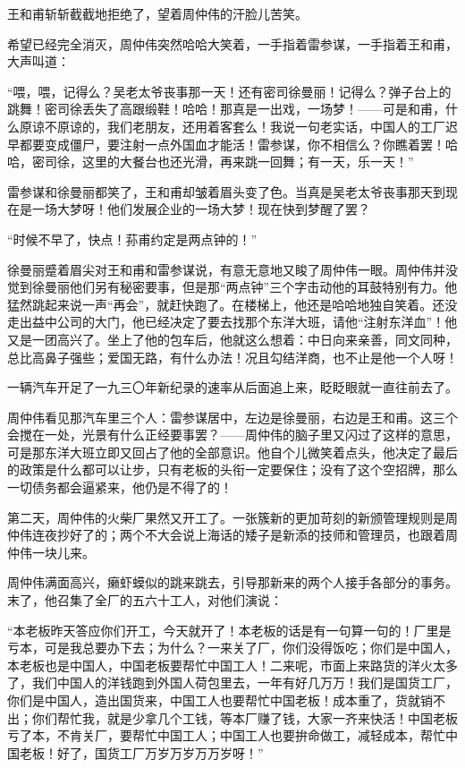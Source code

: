 \par 王和甫斩斩截截地拒绝了，望着周仲伟的汗脸儿苦笑。
\par 希望已经完全消灭，周仲伟突然哈哈大笑着，一手指着雷参谋，一手指着王和甫，大声叫道：
\par “喂，喂，记得么？吴老太爷丧事那一天！还有密司徐曼丽！记得么？弹子台上的跳舞！密司徐丢失了高跟缎鞋！哈哈！那真是一出戏，一场梦！——可是和甫，什么原谅不原谅的，我们老朋友，还用着客套么！我说一句老实话，中国人的工厂迟早都要变成僵尸，要注射一点外国血才能活！雷参谋，你不相信么？你瞧着罢！哈哈，密司徐，这里的大餐台也还光滑，再来跳一回舞；有一天，乐一天！”
\par 雷参谋和徐曼丽都笑了，王和甫却皱着眉头变了色。当真是吴老太爷丧事那天到现在是一场大梦呀！他们发展企业的一场大梦！现在快到梦醒了罢？
\par “时候不早了，快点！荪甫约定是两点钟的！”
\par 徐曼丽蹙着眉尖对王和甫和雷参谋说，有意无意地又睃了周仲伟一眼。周仲伟并没觉到徐曼丽他们另有秘密要事，但是那“两点钟”三个字击动他的耳鼓特别有力。他猛然跳起来说一声“再会”，就赶快跑了。在楼梯上，他还是哈哈地独自笑着。还没走出益中公司的大门，他已经决定了要去找那个东洋大班，请他“注射东洋血”！他又是一团高兴了。坐上了他的包车后，他就这么想着：中日向来亲善，同文同种，总比高鼻子强些；爱国无路，有什么办法！况且勾结洋商，也不止是他一个人呀！
\par 一辆汽车开足了一九三〇年新纪录的速率从后面追上来，眨眨眼就一直往前去了。
\par 周仲伟看见那汽车里三个人：雷参谋居中，左边是徐曼丽，右边是王和甫。这三个会搅在一处，光景有什么正经要事罢？——周仲伟的脑子里又闪过了这样的意思，可是那东洋大班立即又回占了他的全部意识。他自个儿微笑着点头，他决定了最后的政策是什么都可以让步，只有老板的头衔一定要保住；没有了这个空招牌，那么一切债务都会逼紧来，他仍是不得了的！
\par 第二天，周仲伟的火柴厂果然又开工了。一张簇新的更加苛刻的新颁管理规则是周仲伟连夜抄好了的；两个不大会说上海话的矮子是新添的技师和管理员，也跟着周仲伟一块儿来。
\par 周仲伟满面高兴，癞虾蟆似的跳来跳去，引导那新来的两个人接手各部分的事务。末了，他召集了全厂的五六十工人，对他们演说：
\par “本老板昨天答应你们开工，今天就开了！本老板的话是有一句算一句的！厂里是亏本，可是我总要办下去；为什么？一来关了厂，你们没得饭吃；你们是中国人，本老板也是中国人，中国老板要帮忙中国工人！二来呢，市面上来路货的洋火太多了，我们中国人的洋钱跑到外国人荷包里去，一年有好几万万！我们是国货工厂，你们是中国人，造出国货来，中国工人也要帮忙中国老板！成本重了，货就销不出；你们帮忙我，就是少拿几个工钱，等本厂赚了钱，大家一齐来快活！中国老板亏了本，不肯关厂，要帮忙中国工人；中国工人也要拚命做工，减轻成本，帮忙中国老板！好了，国货工厂万岁万岁万万岁呀！”
